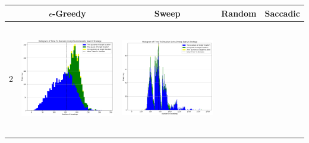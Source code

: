 \begin{landscape}
\begin{table}[h!]
  \centering
  \begin{tabular}{ | c | c | c | c | c |}
    \hline
    & $\epsilon$-Greedy & Sweep & Random & Saccadic \\
    \hline
    2 & 
    \begin{minipage}[c][52mm][c]{49mm}
      \includegraphics[width=49mm, height=49mm]{Chapters/MultiAgentTargetDetection/Figs/Histograms/MultipleTarget/2/2EpsilonGreedyHistogram.png}
    \end{minipage}
    &
    \begin{minipage}[c][52mm][c]{49mm}
      \includegraphics[width=49mm, height=49mm]{Chapters/MultiAgentTargetDetection/Figs/Histograms/MultipleTarget/2/2SweepHistogram.png}


\end{minipage}
\end{tabular}
\end{table}
\end{landscape}
